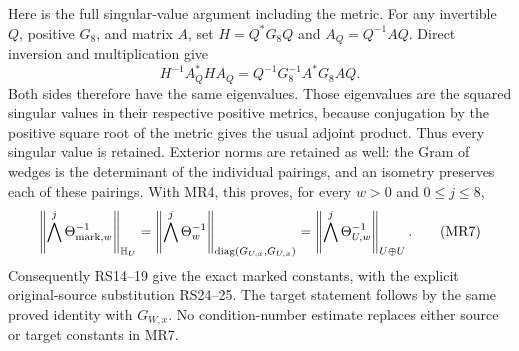Here is the full singular-value argument including the metric.
For any invertible $Q$, positive $G_8$, and matrix $A$, set
$H=Q^*G_8Q$ and $A_Q=Q^{-1}AQ$. Direct inversion and
multiplication give
\begin{equation}
 H^{-1}A_Q^*HA_Q
       =Q^{-1}G_8^{-1}A^*G_8AQ.
 \tag{MR6}
\end{equation}
Both sides therefore have the same eigenvalues. Those eigenvalues
are the squared singular values in their respective positive
metrics, because conjugation by the positive square root of
the metric gives the usual adjoint product. Thus every singular
value is retained. Exterior norms are retained as well: the
Gram of wedges is the determinant of the individual pairings,
and an isometry preserves each of these pairings. With MR4,
this proves, for every $w>0$ and $0\le j\le8$,
\begin{equation}
 \left\|\bigwedge^j\Theta_{{\rm mark},w}^{-1}\right\|_{\mathbb H_U}
 =\left\|\bigwedge^j\Theta_w^{-1}\right\|_{
             \operatorname{diag}(G_{U,x},G_{U,x})}
 =\left\|\bigwedge^j\Theta_{U,w}^{-1}\right\|_{U\oplus U}.
 \tag{MR7}
\end{equation}
Consequently RS14--19 give the exact marked constants, with
the explicit original-source substitution RS24--25. The
target statement follows by the same proved identity with
$G_{W,x}$. No condition-number estimate replaces either
source or target constants in MR7.

